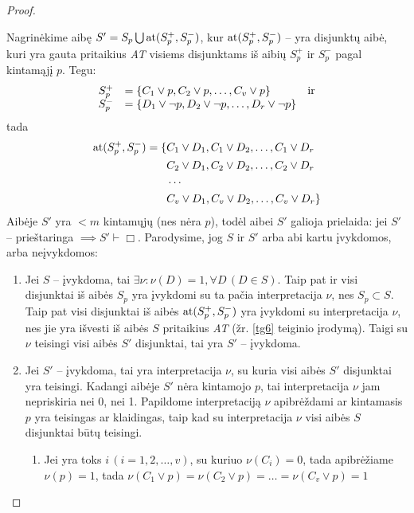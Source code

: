 \begin{prop}
\begin{proof}
\begin{description}
        Nagrinėkime aibę $S' = S_{p} \bigcup \operatorname{at}(S_{p}^{+}, S_{p}^{-})$,
        kur $\operatorname{at}(S_{p}^{+}, S_{p}^{-})$ – yra disjunktų aibė, kuri yra
        gauta pritaikius \emph{AT} visiems disjunktams iš aibių 
        $S_{p}^{+}$ ir $S_{p}^{-}$ pagal kintamąjį $p$. Tegu:
        \[
        \begin{array}{c l l}
          S_{p}^{+} & = \{C_1 \lor p, C_2 \lor p, \dotsc, C_v \lor p \}%
            & \text{ir} \\
          S_{p}^{-} & = \{D_1 \lor \neg p, D_2 \lor \neg p, \dotsc,%
            D_r \lor \neg p \} & {}
        \end{array}
        \]
        tada 
        \begin{align*}
          \at(S_{p}^{+}, S_{p}^{-}) = \{%
          & C_1 \lor D_1, C_1 \lor D_2, \dotsc, C_1 \lor D_r \\
          & C_2 \lor D_1, C_2 \lor D_2, \dotsc, C_2 \lor D_r \\
          & \cdots \\
          & C_v \lor D_1, C_v \lor D_2, \dotsc, C_v \lor D_r \}
        \end{align*}
        Aibėje $S'$ yra $< m$ kintamųjų (nes nėra $p$), todėl aibei 
        $S'$ galioja prielaida: jei $S'$ – prieštaringa 
        $\implies S' \vdash \Box$. Parodysime, jog $S$ ir $S'$ arba
        abi kartu įvykdomos, arba neįvykdomos:
        \begin{enumerate}
          \item Jei $S$ – įvykdoma, tai 
            $\exists \nu : \nu(D) = 1, \forall D \, (D \in S)$. Taip
            pat ir visi disjunktai iš aibės $S_{p}$ yra įvykdomi su 
            ta pačia interpretacija $\nu$, nes $S_{p} \subset S$.
            Taip pat visi disjunktai iš aibės $\operatorname{at}(S_{p}^{+}, S_{p}^{-})$
            yra įvykdomi su interpretacija $\nu$, nes jie yra išvesti iš
            aibės $S$ pritaikius \emph{AT} (žr. \ref{tg6} teiginio 
            įrodymą). Taigi su $\nu$ teisingi visi aibės $S'$ disjunktai,
            tai yra $S'$ – įvykdoma.
          \item Jei $S'$ – įvykdoma, tai yra interpretacija $\nu$, su kuria
            visi aibės $S'$ disjunktai yra teisingi. Kadangi aibėje 
            $S'$ nėra kintamojo $p$, tai interpretacija $\nu$ jam 
            nepriskiria nei 0, nei 1. Papildome interpretaciją $\nu$
            apibrėždami ar kintamasis $p$ yra teisingas ar klaidingas,
            taip kad su interpretacija $\nu$ visi aibės $S$ disjunktai
            būtų teisingi.
            \begin{enumerate}
              \item Jei yra toks $i \, (i=1,2,\dotsc,v)$, su kuriuo 
                $\nu(C_{i}) = 0$, tada apibrėžiame $\nu(p) = 1$, tada
                $\nu(C_1 \lor p) = \nu(C_2 \lor p) = \dots =%
                \nu(C_v \lor p) = 1$


\end{enumerate}
\end{enumerate}
\end{description}
\end{proof}
\end{prop}

